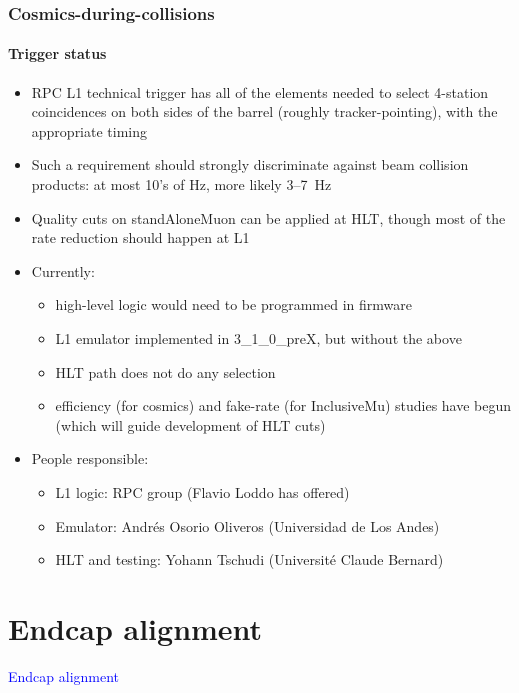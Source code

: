 \documentclass[compress]{beamer}
\begin{document}
\begin{frame}
\frametitle{Cosmics-during-collisions}
\framesubtitle{Trigger status}

\begin{itemize}
\item RPC L1 technical trigger has all of the elements needed to
  select 4-station coincidences on both sides of the barrel (roughly
  tracker-pointing), with the appropriate timing
\item Such a requirement should strongly discriminate against beam
  collision products: at most 10's of Hz, more likely 3--7~Hz
\item Quality cuts on standAloneMuon can be applied at HLT, though
  most of the rate reduction should happen at L1
\item Currently:
\begin{itemize}
\item high-level logic would need to be programmed in firmware
\item L1 emulator implemented in 3\_1\_0\_preX, but without the above
\item HLT path does not do any selection
\item efficiency (for cosmics) and fake-rate (for InclusiveMu) studies
  have begun (which will guide development of HLT cuts)
\end{itemize}
\item People responsible:
\begin{itemize}
\item L1 logic: RPC group (Flavio Loddo has offered)
\item Emulator: Andr\'es Osorio Oliveros (Universidad de Los Andes)
\item HLT and testing: Yohann Tschudi (Universit\'e Claude Bernard)
\end{itemize}
\end{itemize}
\end{frame}

\section*{Endcap alignment}
\begin{frame}
\begin{center}
\Huge \textcolor{blue}{Endcap alignment}
\end{center}
\end{frame}
\end{document}
